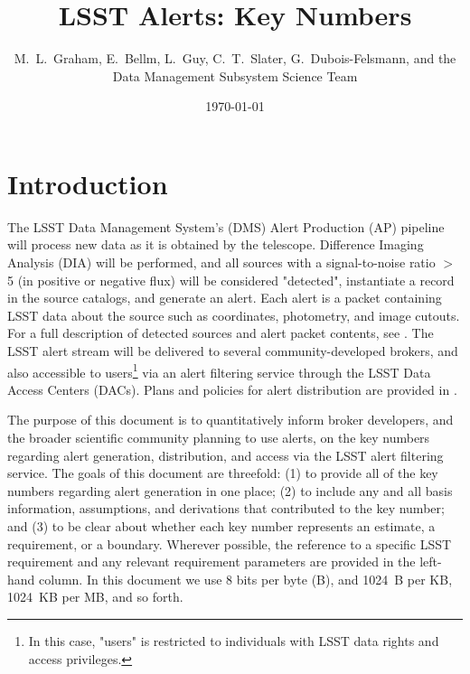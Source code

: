 \documentclass[DM,lsstdraft,authoryear,toc]{lsstdoc}
\title[Alerts Key Numbers]{LSST Alerts: Key Numbers}
\author{%
M.~L.~Graham, E.~Bellm, L.~Guy, C.~T.~Slater, G.~Dubois-Felsmann, and the Data Management Subsystem Science Team
}
\date{\today}
\begin{document}
\maketitle

\section{Introduction} \label{sec:intro}

The LSST Data Management System's (DMS) Alert Production (AP) pipeline will process new data as it is obtained by the telescope. Difference Imaging Analysis (DIA) will be performed, and all sources with a signal-to-noise ratio $>$5 (in positive or negative flux) will be considered "detected", instantiate a record in the source catalogs, and generate an alert. Each alert is a packet containing LSST data about the source such as coordinates, photometry, and image cutouts. For a full description of detected sources and alert packet contents, see . The LSST alert stream will be delivered to several community-developed brokers, and also accessible to users\footnote{In this case, "users" is restricted to individuals with LSST data rights and access privileges.} via an alert filtering service through the LSST Data Access Centers (DACs). Plans and policies for alert distribution are provided in . 

The purpose of this document is to quantitatively inform broker developers, and the broader scientific community planning to use alerts, on the key numbers regarding alert generation, distribution, and access via the LSST alert filtering service. The goals of this document are threefold: (1) to provide all of the key numbers regarding alert generation in one place; (2) to include any and all basis information, assumptions, and derivations that contributed to the key number; and (3) to be clear about whether each key number represents an estimate, a requirement, or a boundary. Wherever possible, the reference to a specific LSST requirement and any relevant requirement parameters are provided in the left-hand column. In this document we use 8 bits per byte (B), and 1024~B per KB, 1024~KB per MB, and so forth.
\end{document}
